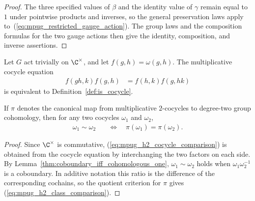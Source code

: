\begin{proof}\leanok
    The three specified values of $\beta$ and the identity value of $\gamma$
    remain equal to $1$ under pointwise products and inverses, so the general
    preservation laws apply to~(\ref{eq:mpug_restricted_gauge_action}).
    The group laws and the composition formulas for the two gauge actions then
    give the identity, composition, and inverse assertions.
\end{proof}

\begin{lemma}
    \label{thm:mpug_h2_trivial_coefficients}
    \leanok
    Let $G$ act trivially on $\C^\times$, and let
    $f(g,h)=\omega(g,h)$. The multiplicative cocycle equation
    \begin{align}
        f(gh,k)f(g,h)
         & =f(h,k)f(g,hk)
        \label{eq:mpug_h2_cocycle_comparison}
    \end{align}
    is equivalent to Definition~\ref{def:is_cocycle}.

    If $\pi$ denotes the canonical map from multiplicative $2$-cocycles to
    degree-two group cohomology, then for any two cocycles $\omega_1$ and
    $\omega_2$,
    \begin{align}
        \omega_1\sim\omega_2
         & \quad\Longleftrightarrow\quad
        \pi(\omega_1)=\pi(\omega_2).
        \label{eq:mpug_h2_class_comparison}
    \end{align}
\end{lemma}

\begin{proof}\leanok
    Since $\C^\times$ is commutative,
    (\ref{eq:mpug_h2_cocycle_comparison}) is obtained from the cocycle
    equation by interchanging the two factors on each side.
    By Lemma~\ref{thm:coboundary_iff_cohomologous_one},
    $\omega_1\sim\omega_2$ holds when $\omega_1\omega_2^{-1}$ is a
    coboundary. In additive notation this ratio is the difference of the
    corresponding cochains, so the quotient criterion for $\pi$ gives
    (\ref{eq:mpug_h2_class_comparison}).
\end{proof}

